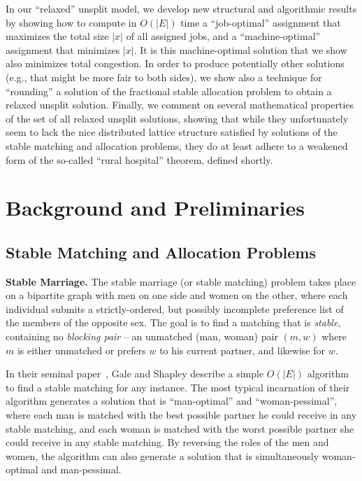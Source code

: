 \documentclass{llncs}
\begin{document}
In our ``relaxed'' unsplit model, we develop new structural and
algorithmic results by showing how to compute in $O(|E|)$ time a
``job-optimal'' assignment that maximizes the total size $|x|$ of all
assigned jobs, and a ``machine-optimal'' assignment that minimizes
$|x|$.  It is this machine-optimal solution that we show also
minimizes total congestion.  In order to produce potentially other
solutions (e.g., that might be more fair to both sides), we show also
a technique for ``rounding'' a solution of the fractional stable
allocation problem to obtain a relaxed unsplit solution.  Finally, we
comment on several mathematical properties of the set of all relaxed
unsplit solutions, showing that while they unfortunately seem to lack
the nice distributed lattice structure satisfied by solutions of the
stable matching and allocation problems, they do at least adhere to a
weakened form of the so-called ``rural hospital'' theorem, defined
shortly.

\iffalse

We review preliminary concepts and background material in the next
section, then introduce our structural and algorithmic results for
computing relaxed unsplit solutions maximizing or minimizing $|x|$,
showing how these can be used to solve the unsplittable stable
allocation problem in linear time.  Finally, we discuss our rounding
method for producing additional relaxed unsplit assignments.

\fi

\section{Background and Preliminaries}

\subsection{Stable Matching and Allocation Problems}

{\bf Stable Marriage.} The stable marriage (or stable matching)
problem takes place on a bipartite graph with men on one side and
women on the other, where each individual submits a strictly-ordered,
but possibly incomplete preference list of the members of the opposite
sex.  The goal is to find a matching that is \emph{stable}, containing
no \emph{blocking pair} -- an unmatched (man, woman) pair $(m,w)$
where $m$ is either unmatched or prefers $w$ to his current partner,
and likewise for $w$.  

In their seminal paper~\cite{GS:1962}, Gale and Shapley describe a
simple $O(|E|)$ algorithm to find a stable matching for any instance.
The most typical incarnation of their algorithm generates a solution
that is ``man-optimal'' and ``woman-pessimal'', where each man is
matched with the best possible partner he could receive in any stable
matching, and each woman is matched with the worst possible partner
she could receive in any stable matching.  By reversing the roles of
the men and women, the algorithm can also generate a solution that is
simultaneously woman-optimal and man-pessimal.
\end{document}
